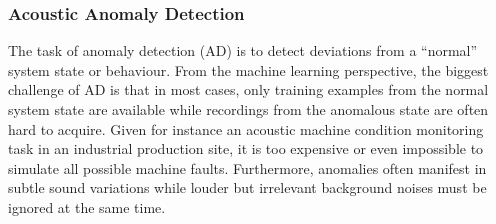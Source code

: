 \documentclass[11pt]{article}
\begin{document}
\subsubsection{Acoustic Anomaly Detection}\label{sec:AD}

The task of anomaly detection (AD) is to detect deviations from a ``normal'' system state or behaviour.
From the machine learning perspective, the biggest challenge of AD is that in most cases, only training examples from the normal system state are available while recordings from the anomalous state are often hard to acquire.
Given for instance an acoustic machine condition monitoring task in an industrial production site, it is too expensive or even impossible to simulate all possible machine faults.
Furthermore, anomalies often manifest in subtle sound variations while louder but irrelevant background noises must be ignored at the same time.
\end{document}
